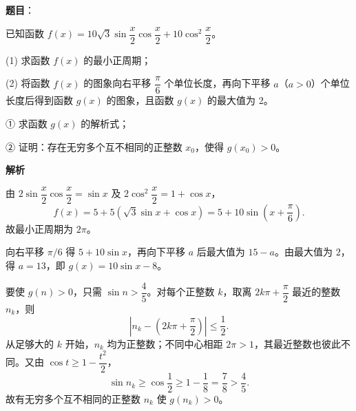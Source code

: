 \begin{answer}

\textbf{题目}：

已知函数 \(f(x)=10\sqrt3\sin\dfrac{x}{2}\cos\dfrac{x}{2}+10\cos^2\dfrac{x}{2}\)。

(1) 求函数 \(f(x)\) 的最小正周期；

(2) 将函数 \(f(x)\) 的图象向右平移 \(\dfrac\pi6\) 个单位长度，再向下平移 \(a\)（\(a>0\)）个单位长度后得到函数 \(g(x)\) 的图象，且函数 \(g(x)\) 的最大值为 2。

① 求函数 \(g(x)\) 的解析式；

② 证明：存在无穷多个互不相同的正整数 \(x_0\)，使得 \(g(x_0)>0\)。

\textbf{解析}


由 \(2\sin\dfrac{x}{2}\cos\dfrac{x}{2}=\sin x\) 及 \(2\cos^2\dfrac{x}{2}=1+\cos x\)，
\nopagebreak[4]
\[
f(x)=5+5(\sqrt3\sin x+\cos x)=5+10\sin(x+\frac\pi6).
\]
故最小正周期为 \(2\pi\)。


向右平移 \(\pi/6\) 得 \(5+10\sin x\)，再向下平移 \(a\) 后最大值为 \(15-a\)。由最大值为 \(2\)，得 \(a=13\)，即 \(g(x)=10\sin x-8\)。

要使 \(g(n)>0\)，只需 \(\sin n>\dfrac45\)。对每个正整数 \(k\)，取离 \(2k\pi+\dfrac\pi2\) 最近的整数 \(n_k\)，则
\nopagebreak[4]
\[
|n_k-(2k\pi+\frac\pi2)|\leqslant\frac12.
\]
从足够大的 \(k\) 开始，\(n_k\) 均为正整数；不同中心相距 \(2\pi>1\)，其最近整数也彼此不同。又由 \(\cos t\geqslant1-\dfrac{t^2}{2}\)，
\nopagebreak[4]
\[
\sin n_k\geqslant\cos\frac12\geqslant1-\frac18=\frac78>\frac45.
\]
故有无穷多个互不相同的正整数 \(n_k\) 使 \(g(n_k)>0\)。



\end{answer}
